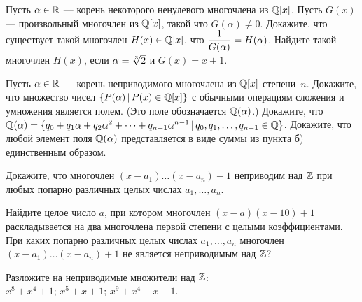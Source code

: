 \documentclass[a4paper,12pt]{article}
\begin{document}
Пусть  $\alpha\in\mathbb{R}$ --- корень некоторого ненулевого
многочлена из $\mathbb{Q}[x]$.
Пусть $G(x)$ --- произвольный многочлен из $\mathbb{Q}[x]$, такой что
$G(\alpha)\ne0.$
Докажите, что  существует такой многочлен $H(x)\in\mathbb{Q}[x]$, что
$\displaystyle{1\over{G(\alpha)}}=H(\alpha)$.
Найдите такой многочлен $H(x)$, если $\alpha=\root 3\of 2$ и $G(x)=x+1$.

Пусть  $\alpha\in\mathbb{R}$ --- корень  неприводимого
многочлена из $\mathbb{Q}[x]$ степени~$n$.
 Докажите, что множество чисел $\{P(\alpha)\,|\,P(x)\in\mathbb{Q}[x]\}$ с
обычными операциям сложения и умножения является полем.
(Это поле обозначается $\mathbb{Q}(\alpha)$.)
 Докажите, что
$\mathbb{Q}(\alpha)=
\{q_0+q_1\alpha+q_2\alpha^2+\dots+q_{n-1}\alpha^{n-1}\,|\,q_0,q_1,\dots,q_{n-1}\in\mathbb{Q}\}$.
 Докажите, что любой элемент поля $\mathbb{Q}(\alpha)$
представляется в виде суммы из пункта б) единственным образом.

 Докажите, что  многочлен  $(x-a_1)\dots(x-a_n)-1$  неприводим над  $\mathbb{Z}$
 при любых попарно различных целых числах  $a_1,\dots,a_n.$


  Найдите целое число $a$, при котором многочлен
$(x-a)(x-10)+1$ раскладывается на два многочлена первой степени
с целыми коэффициентами.
 При каких попарно различных целых числах  $a_1,\dots,a_n$ многочлен
$(x-a_1)\dots(x-a_n)+1$  не является неприводимым над  $\mathbb{Z}$?


  Разложите на неприводимые множители над  $\mathbb{Z}$:\\
 $x^8+x^4+1$;
 $x^5+x+1$;
 $x^9+x^4-x-1$.



\GenXMLW
\end{document}
